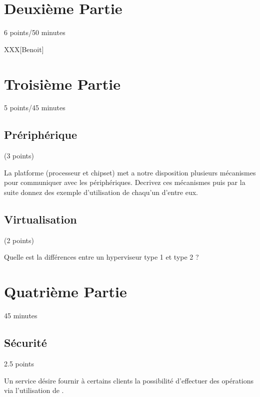 %
%

\section{Deuxi\`eme Partie}
{\hfill{} \scriptsize{6 points/50 minutes}}

XXX[Benoit]

%
%

\section{Troisi\`eme Partie}
{\hfill{} \scriptsize{5 points/45 minutes}}

\subsection{Pr\'eriph\'erique} (3 points)

La platforme (processeur et chipset) met a notre disposition plusieurs
mécanismes pour communiquer avec les périphériques. Decrivez ces
mécanismes puis par la suite donnez des exemple d'utilisation de
chaqu'un d'entre eux.

\begin{correction}
\end{correction}

\subsection{Virtualisation} (2 points)

Quelle est la différences entre un hyperviseur type 1 et type 2 ?

\begin{correction}
\end{correction}

%
%

\section{Quatri\`eme Partie}
{\hfill{} \scriptsize{45 minutes}}

%
%
\subsection{S\'ecurit\'e}
{\hfill{} \scriptsize{2.5 points}}

Un service d\'esire fournir \`a certains clients la possibilit\'e
d'effectuer des op\'erations via l'utilisation de .

